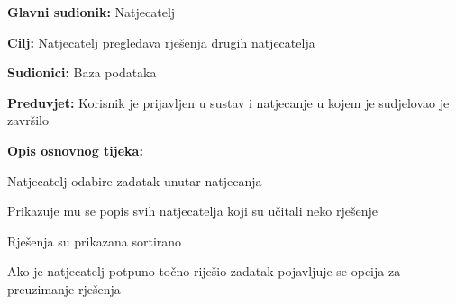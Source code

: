 					
					\noindent {}
					\begin{packed_item}
						
						\item \textbf{Glavni sudionik: }Natjecatelj
						\item  \textbf{Cilj:} Natjecatelj pregledava rješenja drugih natjecatelja 
						\item  \textbf{Sudionici:} Baza podataka
						\item  \textbf{Preduvjet:} Korisnik je prijavljen u sustav i natjecanje u kojem je sudjelovao je završilo
						\item  \textbf{Opis osnovnog tijeka:}
						
						\item[] \begin{packed_enum}
							
							\item Natjecatelj odabire zadatak unutar natjecanja
							\item Prikazuje mu se popis svih natjecatelja koji su učitali neko rješenje
							\item Rješenja su prikazana sortirano 
							\item Ako je natjecatelj potpuno točno riješio zadatak pojavljuje se opcija za preuzimanje rješenja
							
						\end{packed_enum}
					\end{packed_item}
					
					\eject
					
